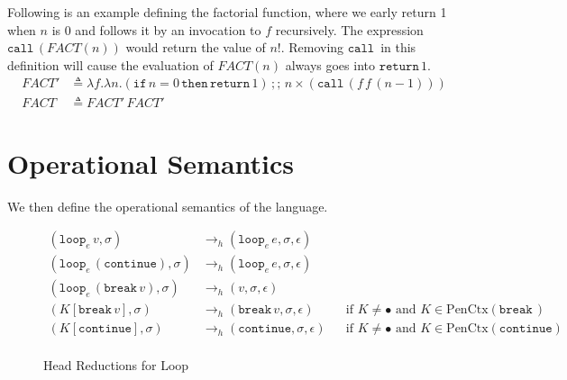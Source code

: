 \documentclass{article}
\numberwithin{algorithm}{section}
\newcommand{\cmdloop}[1]{\texttt{loop}_{#1}\,}
\newcommand{\cmdbreak}{\texttt{break}\,}
\newcommand{\cmdcontinue}{\texttt{continue}}
\newcommand{\cmdreturn}{\texttt{return}\,}
\newcommand{\cmdif}{\texttt{if}\,}
\newcommand{\cmdthen}{\,\texttt{then}\,}
\newcommand{\cmdseq}{\,;;\,}
\newcommand{\cmdcall}{\texttt{call}\,}
\newcommand{\pure}[1]{\text{PenCtx}(#1)}
\newcommand{\hred}{\rightarrow_h}
\newcommand{\tred}{\rightarrow_t}
\newcommand{\tpred}{\rightarrow_{tp}}
\newcommand{\todo}[1]{\textcolor{red}{[TODO: #1]}}
\begin{document}
Following is an example defining the factorial function, where we early return 1 when $n$ is 0 and follows it by an invocation to $f$ recursively. The expression $\cmdcall (\textit{FACT}(n))$ would return the value of $n!$.
Removing $\cmdcall\!$ in this definition will cause the evaluation of $\textit{FACT}(n)$ always goes into $\cmdreturn 1$.
$$
\begin{aligned}
    \textit{FACT}' &\triangleq \lambda f. \lambda n. (\cmdif n = 0 \cmdthen \cmdreturn 1) \cmdseq n \times (\cmdcall (f\, f\, (n - 1))) \\
    \textit{FACT} &\triangleq \textit{FACT}'\,\textit{FACT}'
\end{aligned}
$$


\section{Operational Semantics}

We then define the operational semantics of the language.

\begin{figure}[h]
$$
\begin{aligned}
    (\cmdloop{e} v, \sigma) &\hred (\cmdloop{e} e, \sigma, \epsilon) && \\
    (\cmdloop{e} (\cmdcontinue), \sigma) &\hred (\cmdloop{e} e, \sigma, \epsilon) &&  \\
    (\cmdloop{e} (\cmdbreak v), \sigma) &\hred (v, \sigma, \epsilon) && \\
    (K[\cmdbreak v], \sigma) &\hred (\cmdbreak v, \sigma, \epsilon) && \text{if } K \neq \bullet \text{ and } K \in \pure{\cmdbreak\!} \\
    (K[\cmdcontinue], \sigma) &\hred (\cmdcontinue, \sigma, \epsilon) && \text{if } K \neq \bullet \text{ and } K \in \pure{\cmdcontinue} \\
\end{aligned}
$$
\caption{Head Reductions for Loop}
\label{fig:hred-loop}
\end{figure}
\end{document}
